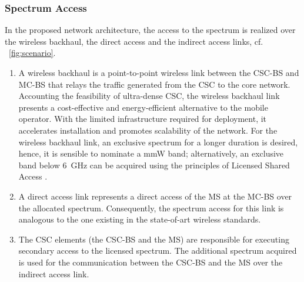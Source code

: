 \subsubsection*{Spectrum Access}
In the proposed network architecture, the access to the spectrum is realized over the wireless backhaul, the direct access and the indirect access links, cf. \figurename~\ref{fig:scenario}.
\begin{enumerate}
\item A wireless backhaul is a
point-to-point wireless link between the CSC-BS and MC-BS that relays the traffic generated from the CSC to the core network. Accounting the feasibility of ultra-dense CSC, the wireless backhaul link presents a cost-effective and energy-efficient alternative to the mobile operator.
With the limited infrastructure required for deployment, it accelerates installation and promotes scalability of the network.
For the wireless backhaul link, an exclusive spectrum for a longer duration is desired, hence, it is sensible to nominate a mmW band; alternatively, an exclusive band below \SI{6}{GHz} can be acquired using the principles of Licensed Shared Access \cite{ETSI13}.

\item A direct access link represents a direct access of the MS at the MC-BS over the allocated spectrum. Consequently, the spectrum access for this link is analogous to the one existing in the state-of-art wireless standards.
\item The CSC elements (the CSC-BS and the MS) are responsible for executing secondary access to the licensed spectrum. The additional spectrum acquired is used for the communication between the CSC-BS and the MS over the indirect access link.
\end{enumerate}


